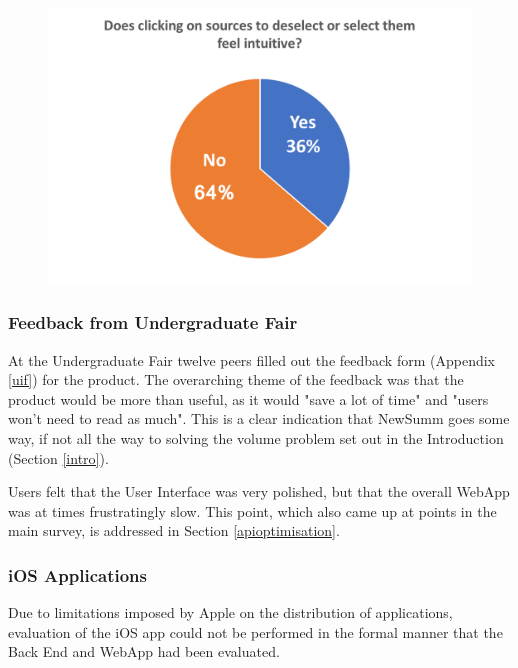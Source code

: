 \documentclass[12pt]{article}
\begin{document}
\begin{figure}[ht!]
  \centering
    \includegraphics[scale=0.6]{ui7.png}
   \caption[A graph depicting responses to the User Interface Survey]{}
   \label{ui7}
\end{figure} 

\subsubsection{Feedback from Undergraduate Fair}

\label{uifeedback}

At the Undergraduate Fair twelve peers filled out the feedback form (Appendix \ref{uif}) for the product. The overarching theme of the feedback was that the product would be more than useful, as it would "save a lot of time" and "users won't need to read as much". This is a clear indication that NewSumm goes some way, if not all the way to solving the volume problem set out in the Introduction (Section \ref{intro}).

Users felt that the User Interface was very polished, but that the overall WebApp was at times frustratingly slow. This point, which also came up at points in the main survey, is addressed in Section \ref{apioptimisation}.

\subsubsection{iOS Applications}

Due to limitations imposed by Apple \cite{apple} on the distribution of applications, evaluation of the iOS app could not be performed in the formal manner that the Back End and WebApp had been evaluated. 
\end{document}
